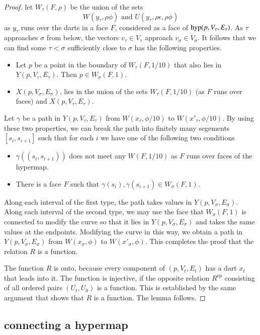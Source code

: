 \begin{proof}
let $W_\tau(F,\rho)$ be the union of the sets
   $$W(y_\tau,\rho\phi) \text{ and } U(y_\tau,\rho\epsilon,\rho\phi)$$
as $y_\tau$ runs over the darts in a face $F$, considered as a face
of ${\operatorname{hyp}}(p,V_\tau,E_\tau)$.
As $\tau$ approaches $\sigma$ from below, the vectors $v_\tau\in V_\tau$
approach $v_\sigma\in V_\sigma$.  It follows that we can find
some $\tau<\sigma$ sufficiently close to $\sigma$ has the
following properties.
\begin{itemize}
 \item Let $p$ be a point in the boundary of $W_\tau(F,1/10)$ that
   also lies in $Y(p,V_\tau,E_\tau)$.  Then $p\in W_\sigma(F,1)$.
 \item  $X(p,V_\sigma,E_\sigma)$, lies in the union of the
  sets $W_\tau(F,1/10)$ (as $F$ runs over faces) and $X(p,V_\tau,E_\tau)$.
\end{itemize}
Let $\gamma$ be a path in $Y(p,V_\tau,E_\tau)$ from $W(x_\tau,\phi/10)$
to $W(x'_\tau,\phi/10)$.  By using these two properties, 
we can break the path into finitely many
segements $[s_i,s_{i+1}]$ such that for each $i$ we have one
of the following two conditions
\begin{itemize} 
\item
$\gamma({(s_i,s_{i+1})})$ does not meet any
$W(F,1/10)$ as $F$ runs over faces of the hypermap.
\item There is a face $F$ such that
$\gamma(s_i), \gamma(s_{i+1})\in W_\sigma(F,1)$.
\end{itemize}
Along each interval of the first type, the path takes values in
$Y(p,V_\sigma,E_\sigma)$.  Along each interval of the second type,
we may use the face that $W_\sigma(F,1)$ is connected to modify
the curve so that it lies in $Y(p,V_\sigma,E_\sigma)$ and takes
the same values at the endpoints.  Modifying the curve in this way,
we obtain a path in $Y(p,V_\sigma,E_\sigma)$
from $W(x_\sigma,\phi)$ to $W(x'_\sigma,\phi)$.  This completes
the proof that the relation $R$ is a function.

The function $R$ is onto, because every component of $(p,V_t,E_t)$
has a dart $x_t$ that leads into it.  The function is injective,
if the opposite relation $R^{op}$ consisting of all ordered pairs
$(U_t,U_0)$ is a function.  This is established by the same argument
that shows that $R$ is a function.  The lemma follows. 
\end{proof}

\subsection{connecting a hypermap}

